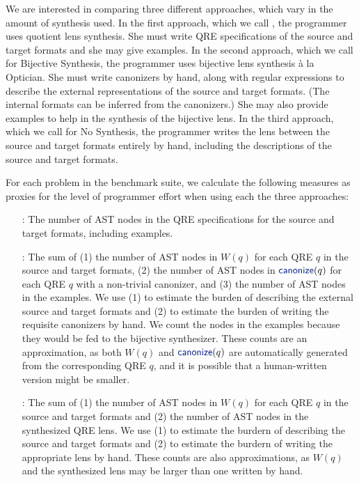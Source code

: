 \documentclass[12pt]{article}
\begin{document}
{We are interested in comparing three different approaches, which vary
in the amount of synthesis used. 
In the first approach, which we call \QRESize{}, the programmer uses
quotient lens synthesis.  She must write QRE specifications of the source and
target formats and she may give examples.
In the second approach, which we call \canonizeAndSpecSize{} for
Bijective Synthesis, the
programmer uses bijective lens synthesis \`a la Optician.
She must write canonizers by hand, along with 
regular expressions to describe the external
representations of the source and target formats. (The internal
formats can be inferred from the canonizers.) She may also
provide examples to help in the synthesis of the bijective lens.
In the third approach, which we call \LensAndSpecSize{} for No Synthesis, the
programmer writes the lens between the source and target formats
entirely by hand, including the descriptions of the source and target
formats.

For each problem in the benchmark suite, we calculate the following measures
as proxies for the level of programmer effort when using each the three
approaches: 

%
\begin{itemize}
  \item[\QRESize{}:] 
  The number of AST nodes in the QRE specifications for the source and
  target formats, including examples. 
  \item[\canonizeAndSpecSize{}:] 
  The sum of (1) the number of AST nodes in $W(q)$ for each QRE $q$ in the source and target
  formats, (2) the number of AST nodes in $\canonize(q)$ for each QRE $q$ with a
  non-trivial canonizer, and (3) the number of AST nodes in the
  examples.  We use (1) to estimate the burden of describing
  the external source and target formats and (2) to estimate the
  burden of writing the requisite canonizers
  by hand.  We count the nodes in the examples because they would be
  fed to the bijective synthesizer.  
  These counts are an approximation, as both $W(q)$ and $\canonize(q)$ are
  automatically generated from the corresponding QRE $q$, and it is
  possible that a human-written version might be smaller.
  \item[\LensAndSpecSize{}:] The sum of (1) the number of AST nodes in
  $W(q)$ for each QRE $q$ in the source and target formats and (2) the
  number of AST nodes in the synthesized QRE lens.  We use (1) to
  estimate the burdern of describing the source and target formats
  and (2) to estimate the burdern of writing the appropriate lens by
  hand. These counts are also approximations, as
  $W(q)$ and the synthesized lens may be larger than one written by hand.
\end{itemize}

}
\end{document}
